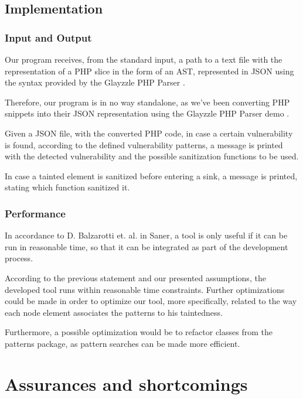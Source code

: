 \documentclass[10pt,onecolumn,a4paper]{article}
\begin{document}
		
	
	\subsection{Implementation}
		\subsubsection{Input and Output}
\hspace{3.5mm} Our program receives, from the standard input, a path to a text file with the representation of a PHP slice in the form of an AST, represented in JSON using the syntax provided by the Glayzzle PHP Parser \cite{PARSER}.

Therefore, our program is in no way standalone, as we've been converting PHP snippets into their JSON  representation using the Glayzzle PHP Parser demo \cite{PARSERDEMO}.
			
Given a JSON file, with the converted PHP code, in case a certain vulnerability is found, according to the defined vulnerability patterns, a message is printed with the detected vulnerability and the possible sanitization functions to be used.
\pagebreak


In case a tainted element is sanitized before entering a sink, a message is printed, stating which function sanitized it.

		
		\subsubsection{Performance}
	
\hspace{3.5mm} In accordance to D. Balzarotti et. al. in Saner\cite{PROPOSED3}, a tool is only useful if it can be run in reasonable time, so that it can be integrated as part of the development process.

According to the previous statement and our presented assumptions, the developed tool runs within reasonable time constraints. Further optimizations could be made in order to optimize our tool, more specifically, related to the way each node element associates the patterns to his taintedness.

Furthermore, a possible optimization would be to refactor classes from the patterns package, as pattern searches can be made more efficient.

		



%
%
\section{Assurances and shortcomings}
\end{document}
